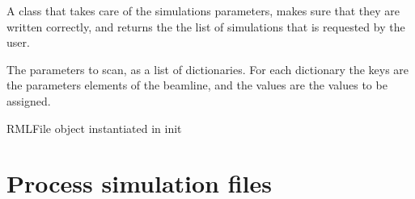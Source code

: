 \documentclass[letterpaper,10pt,english]{sphinxmanual}
\begin{document}
\begin{fulllineitems}
\label{\detokenize{code_documentation:raypyng.simulate.SimulationParams}}
\pysigstartsignatures
{}
\pysigstopsignatures
\sphinxAtStartPar
A class that takes care of the simulations parameters, makes sure that they are written correctly,
and returns the the list of simulations that is requested by the user.

\begin{fulllineitems}
\label{\detokenize{code_documentation:raypyng.simulate.SimulationParams.params}}
\pysigstartsignatures
{}
\pysigstopsignatures
\sphinxAtStartPar
The parameters to scan, as a list of dictionaries.
For each dictionary the keys are the parameters elements of the beamline, and the values are the
values to be assigned.

\end{fulllineitems}


\begin{fulllineitems}
\label{\detokenize{code_documentation:raypyng.simulate.SimulationParams.rml}}
\pysigstartsignatures
{}
\pysigstopsignatures
\sphinxAtStartPar
RMLFile object instantiated in init

\end{fulllineitems}


\end{fulllineitems}



\chapter{Process simulation files}
\label{\detokenize{code_documentation:process-simulation-files}}
\end{document}

